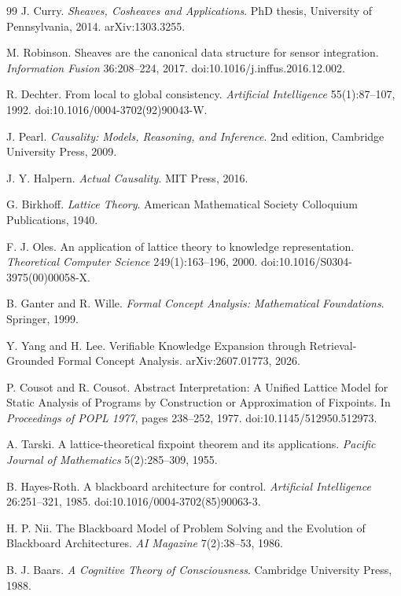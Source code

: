 \documentclass[11pt]{article}
\begin{document}
\begin{thebibliography}{99}
 J. Curry. \emph{Sheaves, Cosheaves and Applications}. PhD thesis, University of Pennsylvania, 2014. arXiv:1303.3255.

 M. Robinson. Sheaves are the canonical data structure for sensor integration. \emph{Information Fusion} 36:208--224, 2017. doi:10.1016/j.inffus.2016.12.002.

 R. Dechter. From local to global consistency. \emph{Artificial Intelligence} 55(1):87--107, 1992. doi:10.1016/0004-3702(92)90043-W.

 J. Pearl. \emph{Causality: Models, Reasoning, and Inference}. 2nd edition, Cambridge University Press, 2009.

 J. Y. Halpern. \emph{Actual Causality}. MIT Press, 2016.

 G. Birkhoff. \emph{Lattice Theory}. American Mathematical Society Colloquium Publications, 1940.

 F. J. Oles. An application of lattice theory to knowledge representation. \emph{Theoretical Computer Science} 249(1):163--196, 2000. doi:10.1016/S0304-3975(00)00058-X.

 B. Ganter and R. Wille. \emph{Formal Concept Analysis: Mathematical Foundations}. Springer, 1999.

 Y. Yang and H. Lee. Verifiable Knowledge Expansion through Retrieval-Grounded Formal Concept Analysis. arXiv:2607.01773, 2026.

 P. Cousot and R. Cousot. Abstract Interpretation: A Unified Lattice Model for Static Analysis of Programs by Construction or Approximation of Fixpoints. In \emph{Proceedings of POPL 1977}, pages 238--252, 1977. doi:10.1145/512950.512973.

 A. Tarski. A lattice-theoretical fixpoint theorem and its applications. \emph{Pacific Journal of Mathematics} 5(2):285--309, 1955.

 B. Hayes-Roth. A blackboard architecture for control. \emph{Artificial Intelligence} 26:251--321, 1985. doi:10.1016/0004-3702(85)90063-3.

 H. P. Nii. The Blackboard Model of Problem Solving and the Evolution of Blackboard Architectures. \emph{AI Magazine} 7(2):38--53, 1986.

 B. J. Baars. \emph{A Cognitive Theory of Consciousness}. Cambridge University Press, 1988.


\end{thebibliography}
\end{document}
